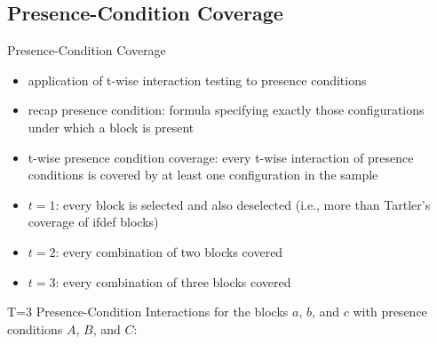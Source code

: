 \subsection{Presence-Condition Coverage}
\begin{frame}{\myframetitle{} }
	\begin{fancycolumns}[widths={48}]
		\begin{definition}{Presence-Condition Coverage\mysource{\krieterpresenceconditioncoverage}}
			\begin{itemize}
				\item application of t-wise interaction testing to presence conditions
				\item recap presence condition: formula specifying exactly those configurations under which a block is present
				\item t-wise presence condition coverage: every t-wise interaction of presence conditions is covered by at least one configuration in the sample
				\item $t=1$: every block is selected and also deselected (i.e., more than Tartler's coverage of ifdef blocks)
				\item $t=2$: every combination of two blocks covered
				\item $t=3$: every combination of three blocks covered
			\end{itemize}
		\end{definition}
	\nextcolumn
		\pause
		\begin{example}{{T=3 Presence-Condition Interactions}}
			for the blocks $a$, $b$, and $c$ with presence conditions $A$, $B$, and $C$:


\end{example}
\end{fancycolumns}
\end{frame}
